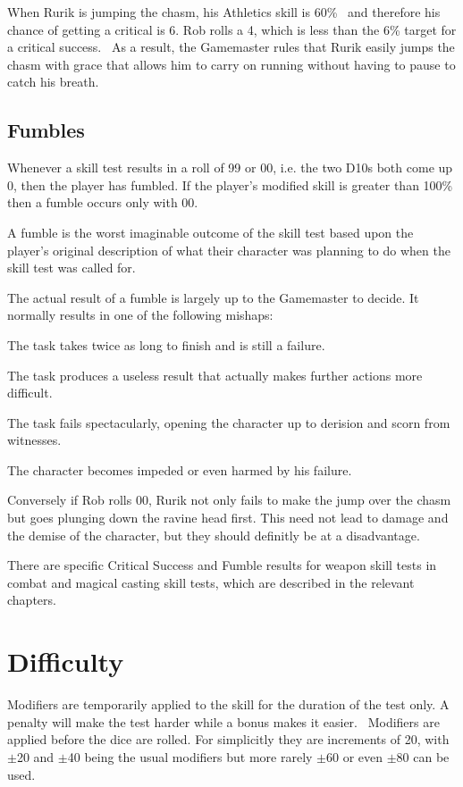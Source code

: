\begin{rpg-examplebox}
When Rurik is jumping the chasm, his Athletics skill is 60\%  and therefore his chance of getting a critical is 6. Rob rolls a 4, which is less than the 6\% target for a critical success.  As a result, the Gamemaster rules that Rurik easily jumps the chasm with grace that allows him to carry on running without having to pause to catch his breath.
\end{rpg-examplebox}

\subsection{Fumbles}
Whenever a skill test results in a roll of 99 or 00, i.e. the two D10s both come up 0, then the player has fumbled. If the player's modified skill is greater than 100\% then a fumble occurs only with 00.

A fumble is the worst imaginable outcome of the skill test based upon the player’s original description of what their character was planning to do when the skill test was called for.

The actual result of a fumble is largely up to the Gamemaster to decide. It normally results in one of the following mishaps: 

\begin{rpg-list}
\item The task takes twice as long to finish and is still a failure. 
\item The task produces a useless result that actually makes further actions more difficult. 
\item The task fails spectacularly, opening the character up to derision and scorn from witnesses. 
\item The character becomes impeded or even harmed by his failure. 
\end{rpg-list}

Conversely if Rob rolls 00, Rurik not only fails to make the jump over the chasm but goes plunging down the ravine head first. This need not lead to damage and the demise of the character, but they should definitly be at a disadvantage.

There are specific Critical Success and Fumble results for weapon skill tests in combat and magical casting skill tests, which are described in the relevant chapters.


\section{Difficulty}
Modifiers are temporarily applied to the skill for the duration of the test only. A penalty will make the test harder while a bonus makes it easier.  Modifiers are applied before the dice are rolled. For simplicitly they are increments of 20, with $\pm$20 and $\pm$40 being the usual modifiers but more rarely $\pm$60 or even $\pm$80 can be used.

